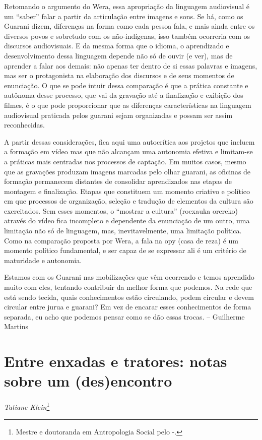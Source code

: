 Retomando o argumento do Wera, essa apropriação da linguagem audiovisual
é um ``saber'' falar a partir da articulação
entre imagens e sons. Se há, como os Guarani dizem, diferenças na forma
como cada pessoa fala, e mais ainda entre os diversos povos e sobretudo
com os não-indígenas, isso também ocorreria com os discursos
audiovisuais. E da mesma forma que o idioma, o aprendizado e
desenvolvimento dessa linguagem depende não só de ouvir (e ver), mas de
aprender a falar aos demais: não apenas ter dentro de si essas palavras
e imagens, mas ser o protagonista na elaboração dos discursos e de seus
momentos de enunciação. O que se pode intuir dessa comparação é que a
prática constante e autônoma desse processo, que vai da gravação até a
finalização e exibição dos filmes, é o que pode proporcionar que as
diferenças características na linguagem audiovisual praticada pelos
guarani sejam organizadas e possam ser assim reconhecidas. 

A partir dessas considerações, fica aqui uma autocrítica aos projetos
que incluem a formação em vídeo mas que não alcançam uma autonomia
efetiva e limitam-se a práticas mais centradas nos processos de
captação. Em muitos casos, mesmo que as gravações produzam imagens
marcadas pelo olhar guarani, as oficinas de formação permanecem
distantes de consolidar aprendizados nas etapas de montagem e
finalização. Etapas que constituem um momento criativo e político em
que processos de organização, seleção e tradução de elementos da
cultura são exercitados. Sem esses momentos, o ``mostrar a cultura''
(roexauka orereko) através do vídeo fica incompleto e dependente da
enunciação de um outro, uma limitação não só de linguagem, mas,
inevitavelmente, uma limitação política. Como na comparação proposta
por Wera, a fala na opy (casa de reza) é um momento político
fundamental, e ser capaz de se expressar ali é um critério de
maturidade e autonomia.

Estamos com os Guarani nas mobilizações que vêm ocorrendo e temos
aprendido muito com eles, tentando contribuir da melhor forma que
podemos. Na rede que está sendo tecida, quais conhecimentos estão
circulando, podem circular e devem circular entre jurua e guarani? Em
vez de encarar esses conhecimentos de forma separada, eu acho que
podemos pensar como se dão essas trocas. – Guilherme Martins

\chapter{Entre enxadas e tratores: notas sobre um (des)encontro}
\begin{flushright}
\emph{Tatiane Klein}\footnote{Mestre e doutoranda em Antropologia Social pelo
-.}
\end{flushright}
\medskip

